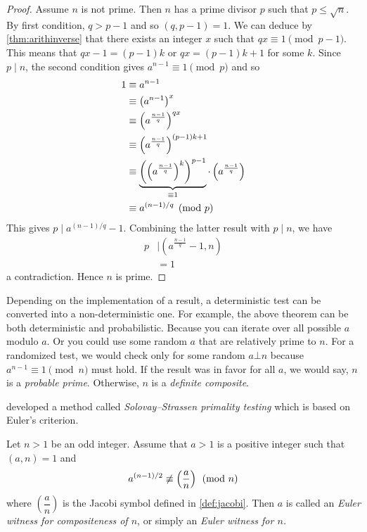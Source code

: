 	\begin{proof}
		Assume $n$ is not prime. Then $n$ has a prime divisor $p$ such that $p \leq \sqrt n$. By first condition, $q>p-1$ and so $(q, p-1)=1$. We can deduce by \autoref{thm:arithinverse} that there exists an integer $x$ such that $qx \equiv 1 \pmod {p-1}$. This means that $qx-1 = (p-1)k$ or $qx = (p-1)k+1$ for some $k$. Since $p\mid n$, the second condition gives $a^{n-1} \equiv 1 \pmod p$ and so
			\begin{align*}
				1 & \equiv a^{n-1} \\
		  & \equiv \left(a^{n-1}\right)^{x}\\
		  & \equiv \left(a^{\frac{n-1}{q}}\right)^{qx}\\
		  & \equiv \left(a^{\frac{n-1}{q}}\right)^{(p-1)k+1}\\
		  & \equiv \underbrace{\left(\left(a^{\frac{n-1}{q}}\right)^{k}\right)^{p-1}}_{\equiv 1} \cdot \left(a^{\frac{n-1}{q}}\right)\\
		  & \equiv a^{(n-1)/q} \pmod p
			\end{align*}
		This gives $p\mid a^{(n-1)/q}-1$. Combining the latter result with $p\mid n$, we have
			\begin{align*}
				p
					& \mid \left(a^{\frac{n-1}{q}}-1,n\right)\\
					&=1
			\end{align*}
		a contradiction. Hence $n$ is prime.
	\end{proof}

	\begin{note}
		Depending on the implementation of a result, a deterministic test can be converted into a non-deterministic one. For example, the above theorem can be both deterministic and probabilistic. Because you can iterate over all possible $a$ modulo $a$. Or you could use some random $a$ that are relatively prime to $n$. For a randomized test, we would check only for some random $a\bot n$ because $a^{n-1}\equiv1\pmod n$ must hold. If the result was in favor for all $a$, we would say, $n$ is a \textit{probable prime}. Otherwise, $n$ is a \textit{definite composite}.
	\end{note}
\textcite{solovay_strassen_1977} developed a method called \textit{Solovay--Strassen primality testing} which is based on Euler's criterion.

	\begin{definition}
		Let $n>1$ be an odd integer. Assume that $a>1$ is a positive integer such that $(a,n)=1$ and
			\begin{align*}
				a^{(n-1)/2} \not \equiv \left(\dfrac{a}{n}\right) \pmod n
			\end{align*}
		where $\left(\dfrac{a}{n}\right)$ is the Jacobi symbol defined in \eqref{def:jacobi}. Then $a$ is called an \textit{Euler witness for compositeness of $n$}, or simply an \textit{Euler witness for $n$.}
	\end{definition}

